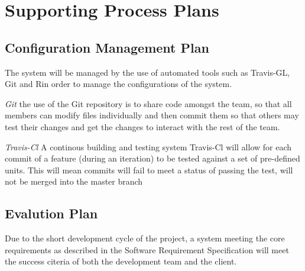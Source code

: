 
\chapter{Supporting Process Plans} %

\label{Part6Chapter6} %



\section{Configuration Management Plan}

The system will be managed by the use of automated tools such as Travis-GL, Git and Rin order to manage the configurations of the system.

\begin{description}
	\item{\emph{Git}} the use of the Git repository is to share code amongst the team, so that all members can modify files individually and then commit them so that others may test their changes and get the changes to interact with the rest of the team.
	\item{\emph{Travis-Cl}} A continous building and testing system Travis-Cl will allow for each commit of a feature (during an iteration) to be tested against a set of pre-defined units. This will mean commits will fail to meet a status of passing the test, will not be merged into the master branch
\end{description}

\section{Evalution Plan}

Due to the short development cycle of the project, a system meeting the core requirements as described in the Software Requirement Specification will meet the success citeria of both the development team and the client.

